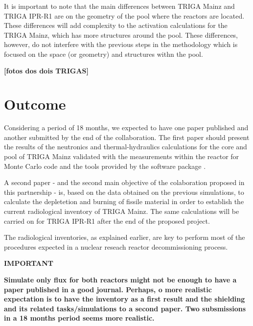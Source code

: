 \documentclass[11pt]{article} %
\begin{document}
It is important to note that the main differences between TRIGA Mainz and TRIGA IPR-R1 are on the geometry of the pool where the reactors are located. These differences will add complexity to the activation calculations for the TRIGA Mainz, which has more structures around the pool. These differences, however, do not interfere with the previous steps in the methodology which is focused on the space (or geometry) and structures withn the pool.


\textbf{[fotos dos dois TRIGAS]}

\section{Outcome}

Considering a period of 18 months, we expected to have one paper published and another submitted by the end of the collaboration. The first paper should present the results of the neutronics and thermal-hydraulics calculations for the core and pool of TRIGA Mainz validated with the measurements within the reactor for \cite[OpenMC]{OpenMC_2015} Monte Carlo code and the tools provided by the software package \cite[SCALE]{SCALE_632}.


A second paper - and the second main objective of the colaboration proposed in this partnership - is, based on the data obtained on the previous simulations, to calculate the depletetion and burning of fissile material in order to establish the current radiological inventory of TRIGA Mainz. The same calculations will be carried on for TRIGA IPR-R1 after the end of the proposed project.

The radiological inventories, as explained earlier, are key to perform most of the procedures expected in a nuclear reseach reactor decommissioning process.

\textbf{IMPORTANT}

\textbf{Simulate only flux for both reactors might not be enough to have a paper published in a good journal. Perhaps, o more realistic expectation is to have the inventory as a first result and the shielding and its related tasks/simulations to a second paper. Two subsmissions in a 18 months period seems more realistic.}
\end{document}
